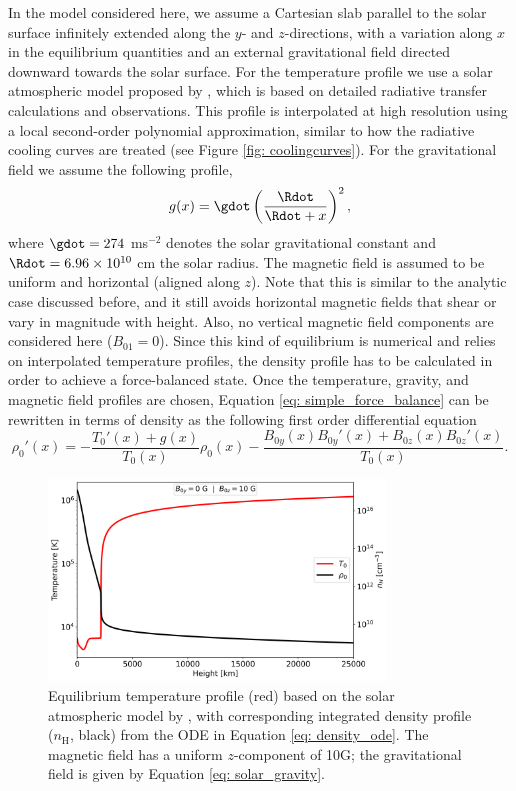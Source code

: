 In the model considered here, we assume a Cartesian slab parallel to the solar surface infinitely extended along the $y$- and $z$-directions, with a variation along $x$ in the equilibrium quantities and an external gravitational field directed downward towards the solar surface. For the temperature profile we use a solar atmospheric model proposed by \citet{avrett2008}, which is based on detailed radiative transfer calculations and observations. This profile is interpolated at high resolution using a local second-order polynomial approximation, similar to how the radiative cooling curves are treated (see Figure \ref{fig: coolingcurves}). For the gravitational field we assume the following profile,
\begin{equation} \label{eq: solar_gravity}
  g(x) = \gdot \left(\frac{\Rdot}{\Rdot + x}\right)^2,
\end{equation}
where $\gdot = 274$ ms$^{-2}$ denotes the solar gravitational constant and $\Rdot = 6.96 \times 10^{10}$ cm the solar radius. The magnetic field is assumed to be uniform and horizontal (aligned along $z$). Note that this is similar to the analytic case discussed before, and it still avoids horizontal magnetic fields that shear or vary in magnitude with height. Also, no vertical magnetic field components are considered here ($B_{01} = 0$). Since this kind of equilibrium is numerical and relies on interpolated temperature profiles, the density profile has to be calculated in order to achieve a force-balanced state. Once the temperature, gravity, and magnetic field profiles are chosen, Equation \eqref{eq: simple_force_balance} can be rewritten in terms of density as the following first order differential equation
\begin{equation} \label{eq: density_ode}
  \rho_0'(x) = -\frac{T_0'(x) + g(x)}{T_0(x)}\rho_0(x) - \frac{B_{0y}(x)B_{0y}'(x) + B_{0z}(x)B_{0z}'(x)}{T_0(x)}.
\end{equation}

\begin{figure}[t]
  \centering
  \includegraphics[width=0.8\textwidth]{profile.png}
  \caption{
    Equilibrium temperature profile (red) based on the solar atmospheric model by \citet{avrett2008}, with corresponding integrated density profile ($n_\text{H}$, black) from the ODE in Equation \eqref{eq: density_ode}. The magnetic field has a uniform $z$-component of 10G; the gravitational field is given by Equation
    \eqref{eq: solar_gravity}.
  }
  \label{fig: temperature-density-profile}
\end{figure}

